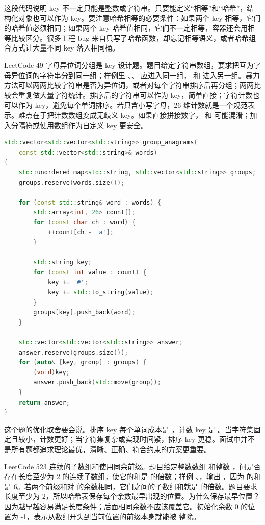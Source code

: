 这段代码说明 key 不一定只能是整数或字符串。只要能定义“相等”和“哈希”，结构化对象也可以作为 key。要注意哈希相等的必要条件：如果两个 key 相等，它们的哈希值必须相同；如果两个 key 哈希值相同，它们不一定相等，容器还会用相等比较区分。很多工程 bug 来自只写了哈希函数，却忘记相等语义，或者哈希组合方式让大量不同 key 落入相同桶。

LeetCode 49 字母异位词分组是 key 设计题。题目给定字符串数组，要求把互为字母异位词的字符串分到同一组；样例里 、、 应进入同一组， 和  进入另一组。暴力方法可以两两比较字符串是否为异位词，或者对每个字符串排序后再分组；两两比较会重复做大量字符统计。排序后的字符串可以作为 key，简单直接；字符计数也可以作为 key，避免每个单词排序。若只含小写字母，26 维计数就是一个规范表示。难点在于把计数数组变成无歧义 key。如果直接拼接数字， 和  可能混淆；加入分隔符或使用数组作为自定义 key 更安全。

\begin{lstlisting}[language=C++,caption={LeetCode 49 字母异位词分组：计数 key 带分隔符}]
std::vector<std::vector<std::string>> group_anagrams(
    const std::vector<std::string>& words)
{
    std::unordered_map<std::string, std::vector<std::string>> groups;
    groups.reserve(words.size());

    for (const std::string& word : words) {
        std::array<int, 26> count{};
        for (const char ch : word) {
            ++count[ch - 'a'];
        }

        std::string key;
        for (const int value : count) {
            key += '#';
            key += std::to_string(value);
        }
        groups[key].push_back(word);
    }

    std::vector<std::vector<std::string>> answer;
    answer.reserve(groups.size());
    for (auto& [key, group] : groups) {
        (void)key;
        answer.push_back(std::move(group));
    }
    return answer;
}
\end{lstlisting}

这个题的优化取舍要会说。排序 key 每个单词成本是 ，计数 key 是 。当字符集固定且较小，计数更好；当字符集复杂或实现时间紧，排序 key 更稳。面试中并不是所有题都追求理论最优，清晰、正确、符合约束的方案更重要。

LeetCode 523 连续的子数组和使用同余前缀。题目给定整数数组  和整数 ，问是否存在长度至少为 2 的连续子数组，使它的和是  的倍数；样例 、，输出 ，因为 \code{[2,4]} 的和是 6。若两个前缀和对  的余数相同，它们之间的子数组和就是  的倍数。题目要求长度至少为 2，所以哈希表保存每个余数最早出现的位置。为什么保存最早位置？因为越早越容易满足长度条件；后面相同余数不应该覆盖它。初始化余数 0 的位置为 -1，表示从数组开头到当前位置的前缀本身就能被  整除。

